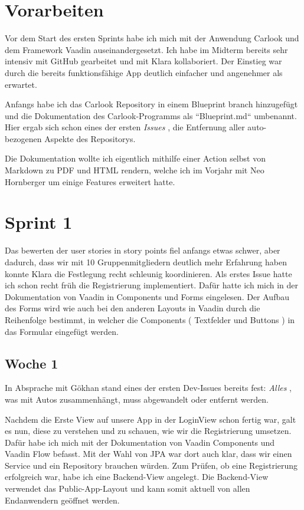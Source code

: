 \section{Vorarbeiten}\label{sec:vorarbeiten}
Vor dem Start des ersten Sprints habe ich mich
mit der Anwendung Carlook und dem Framework Vaadin auseinandergesetzt.
Ich habe im Midterm bereits sehr intensiv mit GitHub gearbeitet und mit Klara kollaboriert.
Der Einstieg war durch die bereits funktionsfähige App deutlich einfacher und angenehmer als erwartet.

Anfangs habe ich das Carlook Repository in einem Blueprint branch hinzugefügt und die Dokumentation
des Carlook-Programms als ``Blueprint.md`` umbenannt.
Hier ergab sich schon eines der ersten \emph{Issues} , die Entfernung aller auto-bezogenen Aspekte
des Repositorys.

Die Dokumentation wollte ich eigentlich mithilfe einer Action selbst von Markdown zu PDF und HTML rendern, welche
ich im Vorjahr mit Neo Hornberger um einige Features erweitert hatte.
\section{Sprint 1}\label{sec:sprint1}
Das bewerten der user stories in story points fiel anfangs etwas schwer, aber dadurch, dass wir mit 10 Gruppenmitgliedern
deutlich mehr Erfahrung haben konnte Klara die Festlegung recht schleunig koordinieren.
Als erstes Issue hatte ich schon recht früh die Registrierung implementiert.
Dafür hatte ich mich in der Dokumentation von Vaadin in Components und Forms eingelesen.
Der Aufbau des Forms wird wie auch bei den anderen Layouts in Vaadin durch die Reihenfolge bestimmt,
in welcher die Components ( Textfelder und Buttons ) in das Formular eingefügt werden.

\subsection{Woche 1}\label{subsec:woche1}
In Absprache mit Gökhan stand eines der ersten Dev-Issues bereits fest: \emph{Alles} , was mit Autos
zusammenhängt, muss abgewandelt oder entfernt werden.

Nachdem die Erste View auf unsere App in der LoginView schon fertig war, galt es nun, diese zu verstehen und zu schauen,
wie wir die Registrierung umsetzen.
Dafür habe ich mich mit der Dokumentation von Vaadin Components und Vaadin Flow befasst.
Mit der Wahl von JPA war dort auch klar, dass wir einen Service und ein Repository brauchen würden.
Zum Prüfen, ob eine Registrierung erfolgreich war, habe ich eine Backend-View angelegt.
Die Backend-View verwendet das Public-App-Layout und kann somit aktuell von allen Endanwendern
geöffnet werden.


